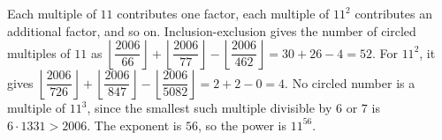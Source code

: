 Each multiple of $11$ contributes one factor, each multiple of $11^2$ contributes an additional factor, and so on. Inclusion-exclusion gives the number of circled multiples of $11$ as $\left\lfloor\dfrac{2006}{66}\right\rfloor+\left\lfloor\dfrac{2006}{77}\right\rfloor-\left\lfloor\dfrac{2006}{462}\right\rfloor=30+26-4=52$. For $11^2$, it gives $\left\lfloor\dfrac{2006}{726}\right\rfloor+\left\lfloor\dfrac{2006}{847}\right\rfloor-\left\lfloor\dfrac{2006}{5082}\right\rfloor=2+2-0=4$. No circled number is a multiple of $11^3$, since the smallest such multiple divisible by $6$ or $7$ is $6\cdot1331>2006$. The exponent is $56$, so the power is $\boxed{11^{56}}$.
